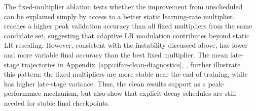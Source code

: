 

The fixed-multiplier ablation tests whether the improvement from unscheduled \method{} can be explained simply by access to a better static learning-rate multiplier. \method{} reaches a higher peak validation accuracy than all fixed multipliers from the same candidate set, suggesting that adaptive LR modulation contributes beyond static LR rescaling. However, consistent with the instability discussed above, \method{} has lower and more variable final accuracy than the best fixed multiplier. The mean late-stage trajectories in Appendix~\ref{app:cifar-clean-diagnostics}, , further illustrate this pattern: the fixed multipliers are more stable near the end of training, while \method{} has higher late-stage variance. Thus, the clean \cifar{} results support \method{} as a peak-performance mechanism, but also show that explicit decay schedules are still needed for stable final checkpoints.
